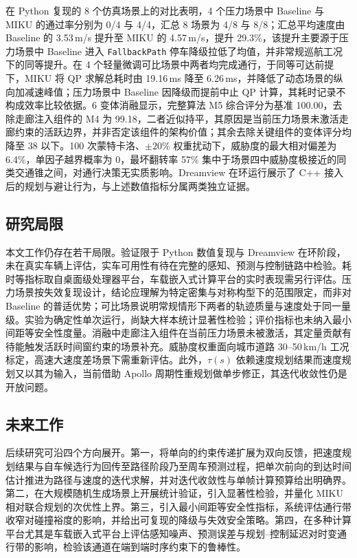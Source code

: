 \documentclass[a4paper,11pt]{ctexart}
\theoremstyle{definition}
\begin{document}
在 Python 复现的 8 个仿真场景上的对比表明，4 个压力场景中 Baseline 与 MIKU 的通过率分别为 0/4 与 4/4，汇总 8 场景为 4/8 与 8/8；汇总平均速度由 Baseline 的 3.53\,m/s 提升至 MIKU 的 4.57\,m/s，提升 29.3\%，该提升主要源于压力场景中 Baseline 进入 \texttt{FallbackPath} 停车降级拉低了均值，并非常规巡航工况下的同等提升。在 4 个轻量微调可比场景中两者均完成通行，于同等可达前提下，MIKU 将 QP 求解总耗时由 19.16\,ms 降至 6.26\,ms，并降低了动态场景的纵向加减速峰值；压力场景中 Baseline 因降级而提前中止 QP 计算，其耗时记录不构成效率比较依据。6 变体消融显示，完整算法 M5 综合评分为基准 100.00，去除走廊注入组件的 M4 为 99.18，二者近似持平，其原因是当前压力场景未激活走廊约束的活跃边界，并非否定该组件的架构价值；其余去除关键组件的变体评分均降至 38 以下。100 次蒙特卡洛、$\pm20\%$ 权重扰动下，威胁度的最大相对偏差为 6.4\%，单因子越界概率为 0，最坏翻转率 57\% 集中于场景四中威胁度极接近的同类交通锥之间，对通行决策无实质影响。Dreamview 在环运行展示了 C++ 接入后的规划与避让行为，与上述数值指标分属两类独立证据。

\subsection{研究局限}

本文工作仍存在若干局限。验证限于 Python 数值复现与 Dreamview 在环阶段，未在真实车辆上评估，实车可用性有待在完整的感知、预测与控制链路中检验。耗时等指标取自桌面级处理器平台，车载嵌入式计算平台的实时表现需另行评估。压力场景按失效复现设计，结论应理解为特定密集与对称构型下的范围限定，而非对 Baseline 的普适优势；可比场景说明常规情形下两者的轨迹质量与速度处于同一量级。实验为确定性单次运行，尚缺大样本统计显著性检验；评价指标也未纳入最小间距等安全性度量。消融中走廊注入组件在当前压力场景未被激活，其定量贡献有待能触发活跃时间窗约束的场景补充。威胁度权重面向城市道路 30--50\,km/h 工况标定，高速大速度差场景下需重新评估。此外，$\tau(s)$ 依赖速度规划结果而速度规划又以其为输入，当前借助 Apollo 周期性重规划做单步修正，其迭代收敛性仍是开放问题。

\subsection{未来工作}

后续研究可沿四个方向展开。第一，将单向的约束传递扩展为双向反馈，把速度规划结果与自车候选行为回传至路径阶段乃至周车预测过程，把单次前向的到达时间估计推进为路径与速度的迭代求解，并对迭代收敛性与单帧计算预算给出明确界。第二，在大规模随机生成场景上开展统计验证，引入显著性检验，并量化 MIKU 相对联合规划的次优性上界。第三，引入最小间距等安全性指标，系统评估通行带收窄对碰撞裕度的影响，并给出可复现的降级与失效安全策略。第四，在多种计算平台尤其是车载嵌入式平台上评估感知噪声、预测误差与规划--控制延迟对时变通行带的影响，检验该通道在端到端时序约束下的鲁棒性。


\printbibliography[heading=bibintoc,title={参考文献}]
\end{document}
